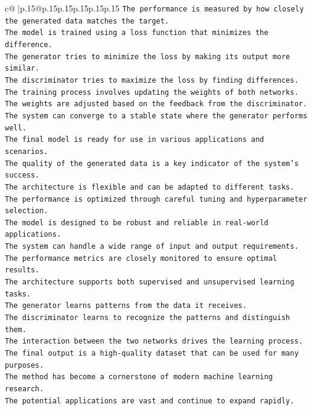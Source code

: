 \documentclass{article}
\begin{document}
{\begin{supertabular}{c@{$\;$}|p{.15\linewidth}@{}p{.15\linewidth}p{.15\linewidth}p{.15\linewidth}p{.15\linewidth}p{.15\linewidth}}
{{{\texttt{The performance is measured by how closely the generated data matches the target.  } \\
\texttt{The model is trained using a loss function that minimizes the difference.  } \\
\texttt{The generator tries to minimize the loss by making its output more similar.  } \\
\texttt{The discriminator tries to maximize the loss by finding differences.  } \\
\texttt{The training process involves updating the weights of both networks.  } \\
\texttt{The weights are adjusted based on the feedback from the discriminator.  } \\
\texttt{The system can converge to a stable state where the generator performs well.  } \\
\texttt{The final model is ready for use in various applications and scenarios.  } \\
\texttt{The quality of the generated data is a key indicator of the system's success.  } \\
\texttt{The architecture is flexible and can be adapted to different tasks.  } \\
\texttt{The performance is optimized through careful tuning and hyperparameter selection.  } \\
\texttt{The model is designed to be robust and reliable in real{-}world applications.  } \\
\texttt{The system can handle a wide range of input and output requirements.  } \\
\texttt{The performance metrics are closely monitored to ensure optimal results.  } \\
\texttt{The architecture supports both supervised and unsupervised learning tasks.  } \\
\texttt{The generator learns patterns from the data it receives.  } \\
\texttt{The discriminator learns to recognize the patterns and distinguish them.  } \\
\texttt{The interaction between the two networks drives the learning process.  } \\
\texttt{The final output is a high{-}quality dataset that can be used for many purposes.  } \\
\texttt{The method has become a cornerstone of modern machine learning research.  } \\
\texttt{The potential applications are vast and continue to expand rapidly.  } \\
}}}
\end{supertabular}}
\end{document}
